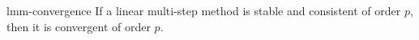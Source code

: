 \begin{Theorem}{lmm-convergence}
  If a linear multi-step method is stable and consistent of order $p$,
  then it is convergent of order $p$.
\end{Theorem}

